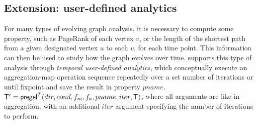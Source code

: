 \subsection{Extension: user-defined analytics}
\label{sec:analytics}

For many types of evolving graph analysis, it is necessary to compute
some property, such as PageRank of each vertex $v$, or the length of
the shortest path from a given designated vertex $u$ to each $v$, for
each time point.  This information can then be used to study how the
graph evolves over time.  \ql supports this type of analysis through
{\em temporal user-defined analytics}, which conceptually execute an
aggregation-map operation sequence repeatedly over a set number of
iterations or until fixpoint and save the result in property $pname$.
$\mathsf{T}' = \textsf{pregel}^T (dir,cond,f_m,f_a,pname,iter,\mathsf{T})$, where
all arguments are like in aggregation, with an additional $iter$
argument specifying the number of iterations to perform.



  
